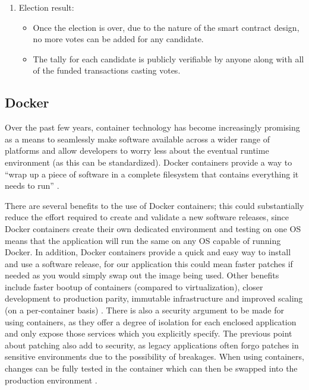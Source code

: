 \documentclass{article}
\begin{document}
\begin{enumerate}
\item Election result:
	\begin{itemize}
		\item Once the election is over, due to the nature of the smart contract design, no more votes can be added for any candidate.
		\item The tally for each candidate is publicly verifiable by anyone along with all of the funded transactions casting votes.
	\end{itemize}

\end{enumerate}

\clearpage    
\subsection{Docker}
Over the past few years, container technology has become increasingly promising as a means to seamlessly make software available across a wider range of platforms and allow developers to worry less about the eventual runtime environment (as this can be standardized). Docker containers provide a way to ``wrap up a piece of software in a complete filesystem that contains everything it needs to run'' \citep{51_kowalkowski_2017}.

There are several benefits to the use of Docker containers; this could substantially reduce the effort required to create and validate a new software releases, since Docker containers create their own dedicated environment and testing on one OS means that the application will run the same on any OS capable of running Docker. In addition, Docker containers provide a quick and easy way to install and use a software release, for our application this could mean faster patches if needed as you would simply swap out the image being used. Other benefits include faster bootup of containers (compared to virtualization), closer development to production parity, immutable infrastructure and improved scaling (on a per-container basis) \citep{52_scherensstraat_2017}. There is also a security argument to be made for using containers, as they offer a degree of isolation for each enclosed application and only expose those services which you explicitly specify. The previous point about patching also add to security, as legacy applications often forgo patches in sensitive environments due to the possibility of breakages. When using containers, changes can be fully tested in the container which can then be swapped into the production environment \citep{53_security_risks_and_benefits_of_docker_application_containers_2017}.
\end{document}
